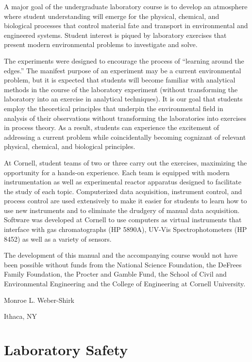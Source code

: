\documentclass[letterpaper,10pt,english]{sphinxmanual}
\begin{document}
A major goal of the undergraduate laboratory course is to develop an atmosphere where student understanding will emerge for the physical, chemical, and biological processes that control material fate and transport in environmental and engineered systems. Student interest is piqued by laboratory exercises that present modern environmental problems to investigate and solve.

The experiments were designed to encourage the process of “learning around the edges.” The manifest purpose of an experiment may be a current environmental problem, but it is expected that students will become familiar with analytical methods in the course of the laboratory experiment (without transforming the laboratory into an exercise in analytical techniques). It is our goal that students employ the theoretical principles that underpin the environmental field in analysis of their observations without transforming the laboratories into exercises in process theory. As a result, students can experience the excitement of addressing a current problem while coincidentally becoming cognizant of relevant physical, chemical, and biological principles.

At Cornell, student teams of two or three carry out the exercises, maximizing the opportunity for a hands-on experience. Each team is equipped with modern instrumentation as well as experimental reactor apparatus designed to facilitate the study of each topic.
Computerized data acquisition, instrument control, and process control are used extensively to make it easier for students to learn how to use new instruments and to eliminate the drudgery of manual data acquisition. Software was developed at Cornell to use computers as virtual instruments that interface with gas chromatographs (HP 5890A), UV-Vis Spectrophotometers (HP 8452) as well as a variety of sensors.

The development of this manual and the accompanying course would not have been possible without funds from the National Science Foundation, the DeFrees Family Foundation, the Procter and Gamble Fund, the School of Civil and Environmental Engineering and the College of Engineering at Cornell University.

Monroe L. Weber-Shirk

Ithaca, NY


\chapter{Laboratory Safety}
\label{\detokenize{Laboratory_Safety/Laboratory_Safety:laboratory-safety}}\label{\detokenize{Laboratory_Safety/Laboratory_Safety:title-laboratory-safety}}\label{\detokenize{Laboratory_Safety/Laboratory_Safety::doc}}
\end{document}
